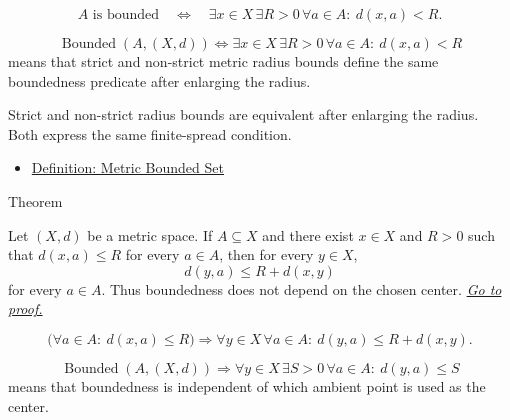 \begin{remark*}
\[
A\text{ is bounded}
\quad\Longleftrightarrow\quad
\exists x\in X\,\exists R>0\,\forall a\in A{:}\ d(x,a)<R.
\]
\end{remark*}

\begin{remark*}
\[
\operatorname{Bounded}(A,(X,d))
\Longleftrightarrow
\exists x\in X\,\exists R>0\,\forall a\in A{:}\ d(x,a)<R
\]
means that strict and non-strict metric radius bounds define the same
boundedness predicate after enlarging the radius.
\end{remark*}

\begin{remark*}[Interpretation]
Strict and non-strict radius bounds are equivalent after enlarging the radius.
Both express the same finite-spread condition.
\end{remark*}

\begin{dependencies}
\begin{itemize}
  \item \hyperref[def:metric-bounded-set]{Definition: Metric Bounded Set}
\end{itemize}
\end{dependencies}

\begin{theorembox}{Theorem}
\begin{theorem}\label{thm:metric-bounded-center-independence}
Let \((X,d)\) be a metric space.  If \(A\subseteq X\) and there exist
\(x\in X\) and \(R>0\) such that \(d(x,a)\leq R\) for every \(a\in A\), then
for every \(y\in X\),
\[
  d(y,a)\leq R+d(x,y)
\]
for every \(a\in A\).  Thus boundedness does not depend on the chosen center.
\hyperref[prf:metric-bounded-center-independence]{\textit{Go to proof.}}
\end{theorem}
\end{theorembox}

\begin{remark*}
\[
\bigl(\forall a\in A{:}\ d(x,a)\leq R\bigr)
\Longrightarrow
\forall y\in X\,\forall a\in A{:}\ d(y,a)\leq R+d(x,y).
\]
\end{remark*}

\begin{remark*}
\[
\operatorname{Bounded}(A,(X,d))
\Longrightarrow
\forall y\in X\,\exists S>0\,\forall a\in A{:}\ d(y,a)\leq S
\]
means that boundedness is independent of which ambient point is used as the
center.
\end{remark*}

